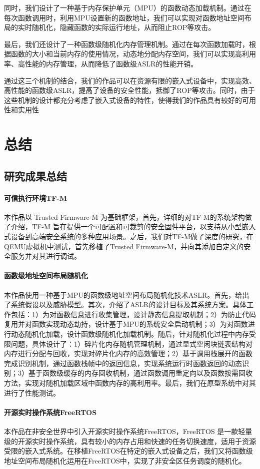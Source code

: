 \documentclass[12pt,a4paper]{ctexart}
\numberwithin{figure}{section}
\begin{document}
\par 同时，我们设计了一种基于内存保护单元（MPU）的函数动态加载机制。通过在每次函数调用时，利用MPU设置新的函数地址，我们可以实现对函数地址空间布局的实时随机化，隐藏函数的实际运行地址，从而阻止ROP等攻击。

\par 最后，我们还设计了一种函数级随机化内存管理机制。通过在每次函数加载时，根据函数的大小和当前内存的使用情况，动态地分配内存空间，我们可以实现高利用率、高性能的内存管理，从而降低了函数级ASLR的性能开销。

\par 通过这三个机制的结合，我们的作品可以在资源有限的嵌入式设备中，实现高效、高性能的函数级ASLR，提高了设备的安全性能，抵御了ROP等攻击。同时，由于这些机制的设计都充分考虑了嵌入式设备的特性，使得我们的作品具有较好的可用性和实用性


\section{总结}
\subsection{研究成果总结}
\paragraph{可信执行环境TF-M}
\par 本作品以 Trusted Firmware-M 为基础框架，首先，详细的对TF-M的系统架构做了介绍，TF-M 旨在提供一个可配置和可裁剪的安全固件平台，以支持从小型嵌入式设备到高端安全系统的多种应用场景。之后，我们对TF-M做了深度的研究，在QEMU虚拟机中测试，首先移植了Trusted Firmware-M，并向其添加自定义的安全服务并对其进行调试。
\paragraph{函数级地址空间布局随机化}
\par 本作品使用一种基于MPU的函数级地址空间布局随机化技术ASLR。首先，给出了系统假设以及威胁模型。其次，介绍了ASLR的设计目标及其系统方案。具体工作包括：1）为对函数信息进行收集管理，设计静态信息提取机制；2）为防止代码复用并对函数实现动态劫持，设计基于MPU的系统安全启动机制；3）为对函数进行动态随机化加载，设计函数级随机化加载机制。随后，针对随机化过程中内存受限问题，具体设计了：1）碎片化内存随机管理机制，通过显式空闲块链表结构对内存进行分配与回收，实现对碎片化内存的高效管理；2）基于调用栈展开的函数完成识别机制，通过函数栈帧中的返回信息，实现系统运行时函数返回的动态识别；3）基于函数级缓存的内存回收机制，通过函数调用重定向以及函数按需回收方法，实现对随机加载区域中函数内存的高利用率。最后，我们在原型系统中对其进行了性能测试。
\paragraph{开源实时操作系统FreeRTOS}
\par 本作品在非安全世界中引入开源实时操作系统FreeRTOS，FreeRTOS 是一款轻量级的开源实时操作系统，具有较小的内存占用和快速的任务切换速度，适用于资源受限的嵌入式系统。在移植FreeRTOS在特定的嵌入式设备之后，我们又将函数级地址空间布局随机化运用在FreeRTOS中，实现了非安全区任务调度的随机化。
\clearpage
\pagestyle{refStyle}


\end{document}
